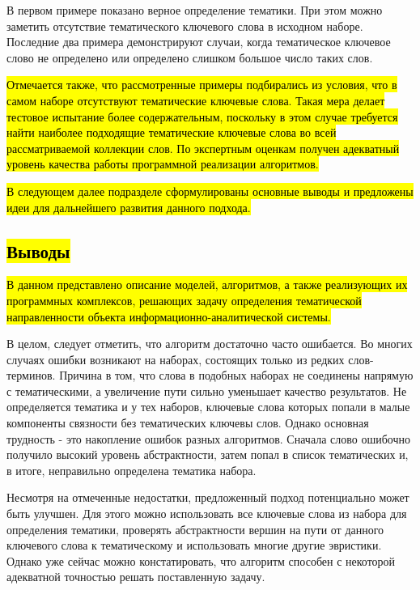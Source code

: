 
В первом примере показано верное определение тематики. При этом можно заметить отсутствие тематического ключевого слова в исходном наборе. Последние два примера демонстрируют случаи, когда тематическое ключевое слово не определено или определено слишком большое число таких слов.

\hl{Отмечается также, что рассмотренные примеры подбирались из условия, что в самом наборе отсутствуют тематические ключевые слова. Такая мера делает тестовое испытание более содержательным, поскольку в этом случае требуется найти наиболее подходящие тематические ключевые слова во всей рассматриваемой коллекции слов. По экспертным оценкам получен адекватный уровень качества работы программной реализации алгоритмов.}

\hl{В следующем далее подразделе сформулированы основные выводы и предложены идеи для дальнейшего развития данного подхода.}

\subsection{\hl{Выводы}}

\hl{В данном представлено описание моделей, алгоритмов, а также реализующих их программных комплексов, решающих задачу определения тематической направленности объекта информационно-аналитической системы.}

В целом, следует отметить, что алгоритм достаточно часто ошибается. Во многих случаях ошибки возникают на наборах, состоящих только из редких слов-терминов. Причина в том, что слова в подобных наборах не соединены напрямую с тематическими, а увеличение пути сильно уменьшает качество результатов. Не определяется тематика и у тех наборов, ключевые слова которых попали в малые компоненты связности без тематических ключевы слов. Однако основная трудность - это накопление ошибок разных алгоритмов. Сначала слово ошибочно получило высокий уровень абстрактности, затем попал в список тематических и, в итоге, неправильно определена тематика набора.

Несмотря на отмеченные недостатки, предложенный подход потенциально может быть улучшен. Для этого можно использовать все ключевые слова из набора для определения тематики, проверять абстрактности вершин на пути от данного ключевого слова к тематическому и использовать многие другие эвристики. Однако уже сейчас можно констатировать, что алгоритм способен с некоторой адекватной точностью решать поставленную задачу. 



